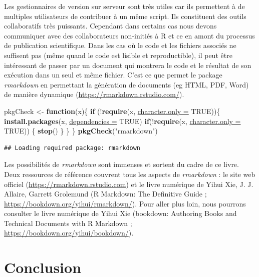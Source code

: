 \documentclass[twoside,symmetric]{book}
\newenvironment{Shaded}{}{}
\newcommand{\ControlFlowTok}[1]{\textbf{#1}}
\newcommand{\DataTypeTok}[1]{\underline{#1}}
\newcommand{\KeywordTok}[1]{\textbf{#1}}
\newcommand{\NormalTok}[1]{#1}
\newcommand{\OperatorTok}[1]{#1}
\newcommand{\OtherTok}[1]{#1}
\newcommand{\StringTok}[1]{#1}
\begin{document}
Les gestionnaires de version sur serveur sont très utiles car ils permettent à de multiples utilisateurs de contribuer à un même script. Ils constituent des outils collaboratifs très puissants. Cependant dans certains cas nous devons communiquer avec des collaborateurs non-initiés à R et ce en amont du processus de publication scientifique. Dans les cas où le code et les fichiers associés ne suffisent pas (même quand le code est lisible et reproductible), il peut être intéressant de passer par un document qui montrera le code et le résultat de son exécution dans un seul et même fichier. C'est ce que permet le package \emph{rmarkdown} en permettant la génération de documents (eg HTML, PDF, Word) de manière dynamique (\url{https://rmarkdown.rstudio.com/}).

\begin{Shaded}
\begin{Highlighting}[]
\NormalTok{pkgCheck <-}\StringTok{ }\ControlFlowTok{function}\NormalTok{(x)\{ }
    \ControlFlowTok{if}\NormalTok{ (}\OperatorTok{!}\KeywordTok{require}\NormalTok{(x, }\DataTypeTok{character.only =} \OtherTok{TRUE}\NormalTok{))\{}
        \KeywordTok{install.packages}\NormalTok{(x, }\DataTypeTok{dependencies =} \OtherTok{TRUE}\NormalTok{)}
        \ControlFlowTok{if}\NormalTok{(}\OperatorTok{!}\KeywordTok{require}\NormalTok{(x, }\DataTypeTok{character.only =} \OtherTok{TRUE}\NormalTok{)) \{}
            \KeywordTok{stop}\NormalTok{()}
\NormalTok{        \}}
\NormalTok{    \}}
\NormalTok{\}}
\KeywordTok{pkgCheck}\NormalTok{(}\StringTok{"rmarkdown"}\NormalTok{)}
\end{Highlighting}
\end{Shaded}

\begin{verbatim}
## Loading required package: rmarkdown
\end{verbatim}

Les possibilités de \emph{rmarkdown} sont immenses et sortent du cadre de ce livre. Deux ressources de référence couvrent tous les aspects de \emph{rmarkdown} : le site web officiel (\url{https://rmarkdown.rstudio.com}) et le livre numérique de Yihui Xie, J. J. Allaire, Garrett Grolemund (R Markdown: The Definitive Guide ; \url{https://bookdown.org/yihui/rmarkdown/}). Pour aller plus loin, nous pourrons consulter le livre numérique de Yihui Xie (bookdown: Authoring Books and Technical Documents with R Markdown ; \url{https://bookdown.org/yihui/bookdown/}).

\hypertarget{conclusion-7}{%
\section{Conclusion}\label{conclusion-7}}
\end{document}
